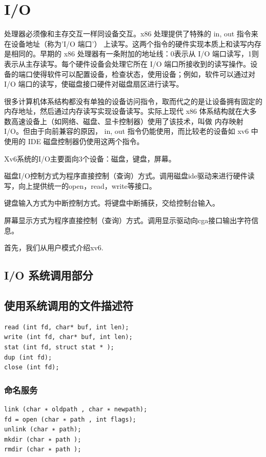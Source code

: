 \section{I/O}

处理器必须像和主存交互一样同设备交互。x86 处理提供了特殊的 in, out 指令来在设备地址（称为'I/O 端口'） 上读写。这两个指令的硬件实现本质上和读写内存是相同的。早期的 x86 处理器有一条附加的地址线：0表示从 I/O 端口读写，1则表示从主存读写。每个硬件设备会处理它所在 I/O 端口所接收到的读写操作。设备的端口使得软件可以配置设备，检查状态，使用设备；例如，软件可以通过对 I/O 端口的读写，使磁盘接口硬件对磁盘扇区进行读写。

很多计算机体系结构都没有单独的设备访问指令，取而代之的是让设备拥有固定的内存地址，然后通过内存读写实现设备读写。实际上现代 x86 体系结构就在大多数高速设备上（如网络、磁盘、显卡控制器）使用了该技术，叫做 内存映射 I/O。但由于向前兼容的原因， in, out 指令仍能使用，而比较老的设备如 xv6 中使用的 IDE 磁盘控制器仍使用这两个指令。

Xv6系统的I/O主要面向3个设备：磁盘，键盘，屏幕。

磁盘I/O控制方式为程序直接控制（查询）方式。调用磁盘ide驱动来进行硬件读写，向上提供统一的open，read，write等接口。

键盘输入方式为中断控制方式。将键盘中断捕获，交给控制台输入。

屏幕显示方式为程序直接控制（查询）方式。调用显示驱动向cga接口输出字符信息。

首先，我们从用户模式介绍xv6.

\subsection{I/O 系统调用部分}

\subsection{使用系统调用的文件描述符}

\begin{verbatim}
read (int fd, char* buf, int len);
write (int fd, char* buf, int len);
stat (int fd, struct stat * );
dup (int fd);
close (int fd);
\end{verbatim}

\subsubsection{命名服务}

\begin{verbatim}
link (char ∗ oldpath , char ∗ newpath);
fd = open (char ∗ path , int flags);
unlink (char ∗ path);
mkdir (char ∗ path );
rmdir (char ∗ path );
\end{verbatim}

